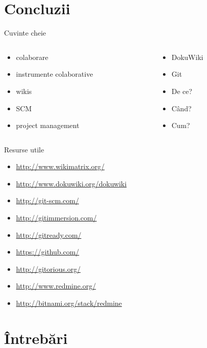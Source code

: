 \documentclass{beamer}
\begin{document}
\section{Concluzii}

\begin{frame}{Cuvinte cheie}
  \begin{columns}
    \begin{column}[l]{0.5\textwidth}
      \begin{itemize}
        \item colaborare
        \item instrumente colaborative
        \item wikis
        \item SCM
        \item project management
      \end{itemize}
    \end{column}
    \begin{column}[l]{0.5\textwidth}
      \begin{itemize}
        \item DokuWiki
        \item Git
        \item De ce?
        \item Când?
        \item Cum?
      \end{itemize}
    \end{column}
  \end{columns}
\end{frame}

\begin{frame}{Resurse utile}
  \begin{itemize}
    \small
    \item \url{http://www.wikimatrix.org/}
    \item \url{http://www.dokuwiki.org/dokuwiki}
    \item \url{http://git-scm.com/}
    \item \url{http://gitimmersion.com/}
    \item \url{http://gitready.com/}
    \item \url{https://github.com/}
    \item \url{http://gitorious.org/}
    \item \url{http://www.redmine.org/}
    \item \url{http://bitnami.org/stack/redmine}
  \end{itemize}
\end{frame}

\section{Întrebări}
\end{document}
